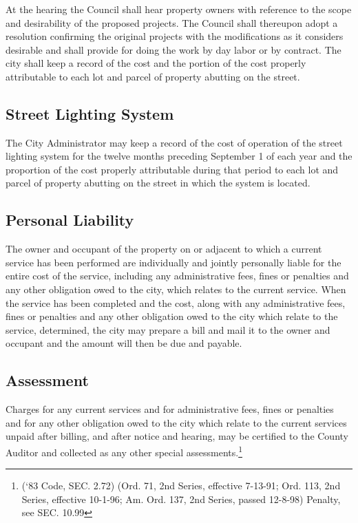 \subsubsection{}
At the hearing the Council shall hear property owners with reference to the scope and desirability of the proposed projects.  The Council shall thereupon adopt a resolution confirming the original projects with the modifications as it considers desirable and shall provide for doing the work by day labor or by contract.  The city shall keep a record of the cost and the portion of the cost properly attributable to each lot and parcel of property abutting on the street.
\subsection{Street Lighting System}
The City Administrator may keep a record of the cost of operation of the street lighting system for the twelve months preceding September 1 of each year and the proportion of the cost properly attributable during that period to each lot and parcel of property abutting on the street in which the system is located.
\subsection{Personal Liability}
The owner and occupant of the property on or adjacent to which a current service has been performed are individually and jointly personally liable for the entire cost of the service, including any administrative fees, fines or penalties and any other obligation owed to the city, which relates to the current service. When the service has been completed and the cost, along with any administrative fees, fines or penalties and any other obligation owed to the city which relate to the service, determined, the city may prepare a bill and mail it to the owner and occupant and the amount will then be due and payable.
\subsection{Assessment}
Charges for any current services and for administrative fees, fines or penalties and for any other obligation owed to the city which relate to the current services unpaid after billing, and after notice and hearing, may be certified to the County Auditor and collected as any other special assessments.\footnote{(‘83 Code, SEC. 2.72)  (Ord. 71, 2nd Series, effective 7-13-91; Ord. 113, 2nd Series, effective 10-1-96; Am. Ord. 137, 2nd Series, passed 12-8-98)  Penalty, see SEC. 10.99}

